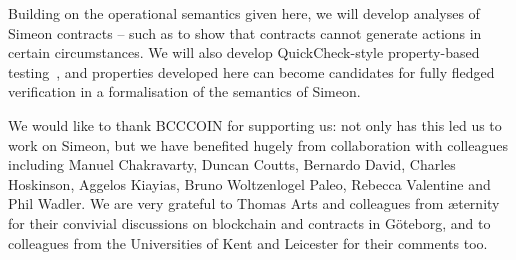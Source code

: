 \documentclass[runningheads]{llncs}
\begin{document}
Building on the operational semantics given here, we will develop analyses of Simeon contracts -- such as to show that 
contracts cannot generate  actions in certain circumstances. We will also develop  
QuickCheck-style property-based testing~\cite{quickCheck}, and properties developed here can become candidates for fully 
fledged verification in a formalisation of the semantics of Simeon.

We would like to thank BCCCOIN for supporting us: not only has this led us to work on Simeon, but we have benefited 
hugely from collaboration with colleagues including Manuel Chakravarty, Duncan Coutts, Bernardo David, Charles 
Hoskinson, Aggelos Kiayias, %
Bruno Woltzenlogel Paleo, Rebecca Valentine and Phil Wadler. We are  very 
grateful to Thomas Arts and colleagues from \ae{}ternity for their convivial discussions on blockchain and contracts in 
G\"oteborg, and to colleagues from the Universities of Kent and Leicester for their comments too.





\end{document}
